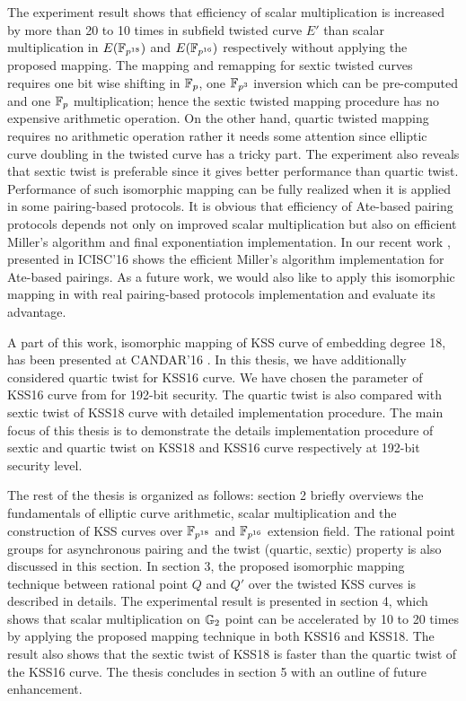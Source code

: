The experiment result shows  that efficiency of  scalar multiplication is increased by more than 20 to 10 times in subfield  twisted curve $E'$ than scalar multiplication in $E(\mathbb{F}_{p^{18}})$ and $E(\mathbb{F}_{p^{16}})$ respectively without applying the proposed mapping. The mapping and remapping for sextic twisted curves requires one bit wise shifting in ${\mathbb{F}}_{p}$, one $\mathbb{F}_{p^3}$ inversion which can be pre-computed and one ${\mathbb{F}}_{p}$ multiplication; hence the sextic twisted mapping procedure has no expensive arithmetic operation. On the other hand, quartic twisted mapping requires no arithmetic operation rather it needs some attention since elliptic curve doubling in the twisted curve has a tricky part. The experiment also reveals that sextic twist is preferable since it gives better performance than quartic twist. 
Performance of such isomorphic mapping can be fully realized when it is applied in some pairing-based protocols. 
It is obvious that efficiency of Ate-based pairing protocols depends not only on improved scalar multiplication but also on efficient Miller's algorithm  and final exponentiation implementation. In our recent work \cite{ICISC:KONSD16}, presented in ICISC'16 shows the  efficient Miller's algorithm implementation for Ate-based pairings. 
As a future work, we would also like to apply this isomorphic mapping  in \cite{ICISC:KONSD16} with real pairing-based protocols implementation and evaluate its advantage. 

A part of this work, isomorphic mapping of KSS curve of embedding degree 18, has been presented at CANDAR'16 \cite{self_candar}.
In this thesis, we have additionally considered quartic twist for  KSS16 curve. 
We have chosen the parameter of KSS16 curve from \cite{EPRINT:GhaFou16b} for 192-bit security.
The quartic twist is also compared with sextic twist of KSS18 curve with detailed implementation procedure. 
The main focus of this thesis is to demonstrate the details implementation procedure of sextic and quartic twist on KSS18 and KSS16 curve respectively at 192-bit security level. 

The rest of the thesis is organized as follows: section 2  briefly overviews the fundamentals of elliptic curve arithmetic, scalar multiplication and the construction of  KSS curves over $\mathbb{F}_{p^{18}}$ and $\mathbb{F}_{p^{16}}$ extension field. The rational point groups for asynchronous pairing and the twist (quartic, sextic) property is also discussed in this section.  
In section 3, the proposed isomorphic mapping technique between rational point $Q$ and $Q'$ over the twisted KSS curves is described in details. 
The experimental result is presented in section 4, which shows that scalar multiplication on ${\mathbb{G}}_{2}$ point can be accelerated by 10 to 20 times by applying the proposed mapping technique in both KSS16 and KSS18. The result also shows that the sextic twist of KSS18 is faster than the quartic twist of the KSS16 curve. 
The thesis concludes in section 5  with an outline of future enhancement.

